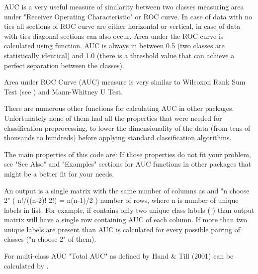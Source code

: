 \begin{Details}\relax
AUC is a very useful measure of similarity between two classes measuring area
under "Receiver Operating Characteristic" or ROC curve.
In case of data with no ties all sections of ROC curve are either horizontal
or vertical, in case of data with ties diagonal 
sections can also occur. Area under the ROC curve is calculated using 
 function. AUC is always in between 0.5 
(two classes are statistically identical) and 1.0 (there is a threshold value
that can achieve a perfect separation between the classes).

Area under ROC Curve (AUC) measure is very similar to Wilcoxon Rank Sum Test 
(see ) and Mann-Whitney U Test. 

There are numerous other functions for calculating AUC in other packages. 
Unfortunately none of them had all the properties that were needed for 
classification preprocessing, to lower the dimensionality of the data (from 
tens of thousands to hundreds) before applying standard classification 
algorithms. 

The main properties of this code are: 
If those properties do not fit your problem, see "See Also" and "Examples" 
sections for AUC 
functions in other packages that might be a better fit for your needs.
\end{Details}
\begin{Value}
An output is a single matrix with the same number of columns as  and 
"n choose 2" ( 
{n!/((n-2)! 2!) = n(n-1)/2} ) number of rows, 
where n is number of unique labels in  list. For example, if  
contains only two unique class labels (  ) than
output 
matrix will  have a single row containing AUC of each column. If more than 
two unique labels are present than AUC is calculated for every possible 
pairing of classes ("n choose 2" of them).

For multi-class AUC "Total AUC" as defined by Hand \& Till (2001) can be 
calculated by .
\end{Value}
